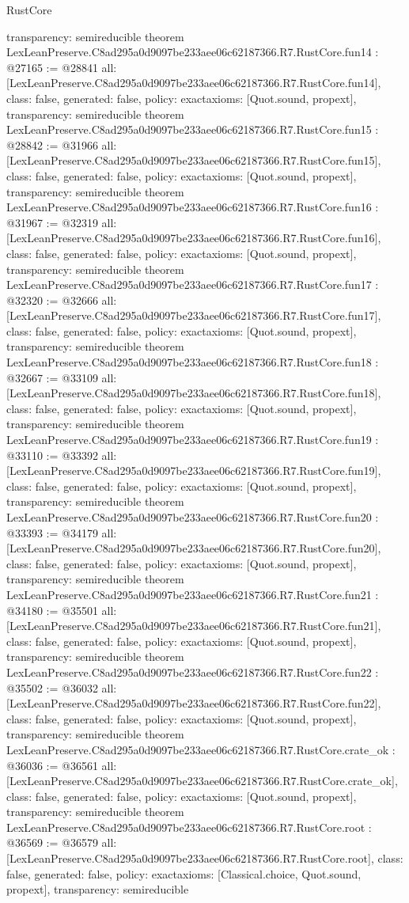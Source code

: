 \begin{lexlean}{RustCore}
\begin{coremodule}
{  transparency: semireducible
}
theorem LexLeanPreserve.C8ad295a0d9097be233aee06c62187366.R7.RustCore.fun14 : @27165 := @28841 {
  all: [LexLeanPreserve.C8ad295a0d9097be233aee06c62187366.R7.RustCore.fun14],
  class: false,
  generated: false,
  policy: exact{axioms: [Quot.sound, propext]},
  transparency: semireducible
}
theorem LexLeanPreserve.C8ad295a0d9097be233aee06c62187366.R7.RustCore.fun15 : @28842 := @31966 {
  all: [LexLeanPreserve.C8ad295a0d9097be233aee06c62187366.R7.RustCore.fun15],
  class: false,
  generated: false,
  policy: exact{axioms: [Quot.sound, propext]},
  transparency: semireducible
}
theorem LexLeanPreserve.C8ad295a0d9097be233aee06c62187366.R7.RustCore.fun16 : @31967 := @32319 {
  all: [LexLeanPreserve.C8ad295a0d9097be233aee06c62187366.R7.RustCore.fun16],
  class: false,
  generated: false,
  policy: exact{axioms: [Quot.sound, propext]},
  transparency: semireducible
}
theorem LexLeanPreserve.C8ad295a0d9097be233aee06c62187366.R7.RustCore.fun17 : @32320 := @32666 {
  all: [LexLeanPreserve.C8ad295a0d9097be233aee06c62187366.R7.RustCore.fun17],
  class: false,
  generated: false,
  policy: exact{axioms: [Quot.sound, propext]},
  transparency: semireducible
}
theorem LexLeanPreserve.C8ad295a0d9097be233aee06c62187366.R7.RustCore.fun18 : @32667 := @33109 {
  all: [LexLeanPreserve.C8ad295a0d9097be233aee06c62187366.R7.RustCore.fun18],
  class: false,
  generated: false,
  policy: exact{axioms: [Quot.sound, propext]},
  transparency: semireducible
}
theorem LexLeanPreserve.C8ad295a0d9097be233aee06c62187366.R7.RustCore.fun19 : @33110 := @33392 {
  all: [LexLeanPreserve.C8ad295a0d9097be233aee06c62187366.R7.RustCore.fun19],
  class: false,
  generated: false,
  policy: exact{axioms: [Quot.sound, propext]},
  transparency: semireducible
}
theorem LexLeanPreserve.C8ad295a0d9097be233aee06c62187366.R7.RustCore.fun20 : @33393 := @34179 {
  all: [LexLeanPreserve.C8ad295a0d9097be233aee06c62187366.R7.RustCore.fun20],
  class: false,
  generated: false,
  policy: exact{axioms: [Quot.sound, propext]},
  transparency: semireducible
}
theorem LexLeanPreserve.C8ad295a0d9097be233aee06c62187366.R7.RustCore.fun21 : @34180 := @35501 {
  all: [LexLeanPreserve.C8ad295a0d9097be233aee06c62187366.R7.RustCore.fun21],
  class: false,
  generated: false,
  policy: exact{axioms: [Quot.sound, propext]},
  transparency: semireducible
}
theorem LexLeanPreserve.C8ad295a0d9097be233aee06c62187366.R7.RustCore.fun22 : @35502 := @36032 {
  all: [LexLeanPreserve.C8ad295a0d9097be233aee06c62187366.R7.RustCore.fun22],
  class: false,
  generated: false,
  policy: exact{axioms: [Quot.sound, propext]},
  transparency: semireducible
}
theorem LexLeanPreserve.C8ad295a0d9097be233aee06c62187366.R7.RustCore.crate_ok : @36036 := @36561 {
  all: [LexLeanPreserve.C8ad295a0d9097be233aee06c62187366.R7.RustCore.crate_ok],
  class: false,
  generated: false,
  policy: exact{axioms: [Quot.sound, propext]},
  transparency: semireducible
}
theorem LexLeanPreserve.C8ad295a0d9097be233aee06c62187366.R7.RustCore.root : @36569 := @36579 {
  all: [LexLeanPreserve.C8ad295a0d9097be233aee06c62187366.R7.RustCore.root],
  class: false,
  generated: false,
  policy: exact{axioms: [Classical.choice, Quot.sound, propext]},
  transparency: semireducible
}


\end{coremodule}
\end{lexlean}
